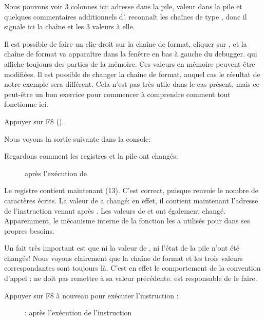 Nous pouvons voir 3 colonnes ici: adresse dans la pile, valeur dans la pile et quelques
commentaires additionnels d'\olly.
\olly reconnaît les chaînes de type \printf{}, donc il signale ici la chaîne et
les 3 valeurs  à elle.

Il est possible de faire un clic-droit sur la chaîne de format, cliquer sur ,
et la chaîne de format va apparaître dans la fenêtre en bas à gauche du debugger. qui affiche
toujours des parties de la mémoire.
Ces valeurs en mémoire peuvent être modifiées.
Il est possible de changer la chaîne de format, auquel cas le résultat de notre
exemple sera différent.
Cela n'est pas très utile dans le cas présent, mais ce peut-être un bon exercice
pour commencer à comprendre comment tout fonctionne ici.

\clearpage
Appuyer sur F8 (\stepover).

Nous voyons la sortie suivante dans la console:



Regardons comment les registres et la pile ont changés:

\begin{figure}[H]
\centering
{}
\caption{\olly après l'exécution de \printf{}}
\label{fig:printf3_olly_3}
\end{figure}

Le registre \EAX contient maintenant  (13).
C'est correct, puisque \printf renvoie le nombre de caractères écrits.
La valeur de \EIP a changé: en effet, il contient maintenant l'adresse de l'instruction
venant après
.
Les valeurs de \ECX et \EDX ont également changé.
Apparemment, le mécanisme interne de la fonction \printf les a utilisés pour dans
ses propres besoins.

Un fait très important est que ni la valeur de \ESP, ni l'état de la pile n'ont
été changés!
Nous voyons clairement que la chaîne de format et les trois valeurs correspondantes
sont toujours là.
C'est en effet le comportement de la convention d'appel : 
ne doit pas remettre \ESP à sa valeur précédente.
 est responsable de le faire.

\clearpage
Appuyer sur F8 à nouveau pour exécuter l'instruction :

\begin{figure}[H]
\centering
{}
\caption{\olly: après l'exécution de l'instruction }
\label{fig:printf3_olly_4}
\end{figure}

